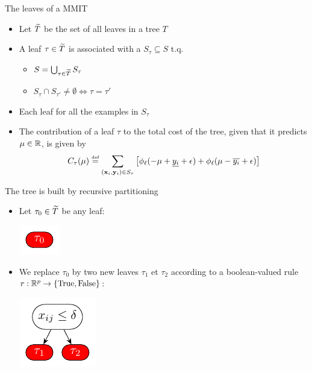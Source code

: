\documentclass{beamer}
\newcommand{\ylower}[1]{\ensuremath{\underline{y_{#1}}}}
\newcommand{\yupper}[1]{\ensuremath{\overline{y_{#1}}}}
\begin{document}
\begin{frame}{The leaves of a MMIT}
	\begin{itemize}
		\item<+-> Let $\widetilde{T}$ be the set of all leaves in a tree $T$
		\vspace{4mm}
		\item<+-> A leaf $\tau \in \widetilde{T}$ is associated with a  $S_\tau \subseteq S$ t.q.
			\begin{itemize}
				\item $S = \bigcup_{\tau \in \widetilde{T}} S_\tau$
				\vspace{2mm}
				\item $S_\tau \cap S_{\tau'} \not= \emptyset \Leftrightarrow \tau = \tau'$
			\end{itemize}
		\vspace{4mm}
		\item<+-> Each leaf  for all the examples in $S_\tau$
		\vspace{4mm}
		\item<+-> The contribution of a leaf $\tau$ to the total cost of the tree, given that it predicts $\mu \in \mathbb{R}$, is given by
		\begin{equation*}
		C_\tau(\mu) \eqdef \sum_{(\xb_i, \yb_i) \in S_\tau} \left[ \phi_\ell( - \mu + \ylower{i} + \epsilon) + \phi_\ell( \mu - \yupper{i} + \epsilon) \right]
		\end{equation*}
	\end{itemize}
\end{frame}

\begin{frame}{The tree is built by recursive partitioning}
	\begin{itemize}
		\item Let $\tau_0 \in \widetilde{T}$ be any leaf:
		\begin{center}
			\includegraphics[scale=1.2]{figures/leaf_split/root_leaf.pdf}
		\end{center}
		
		\vspace{6mm}
		
		\item We replace $\tau_0$ by two new leaves $\tau_1$ et $\tau_2$ according to a boolean-valued rule $r: \mathbb{R}^p \rightarrow \{\text{True}, \text{False}\}$:
		\begin{center}
			\includegraphics[scale=1.2]{figures/leaf_split/split_rule.pdf}
		\end{center}
		
	\end{itemize}
\end{frame}
\end{document}
